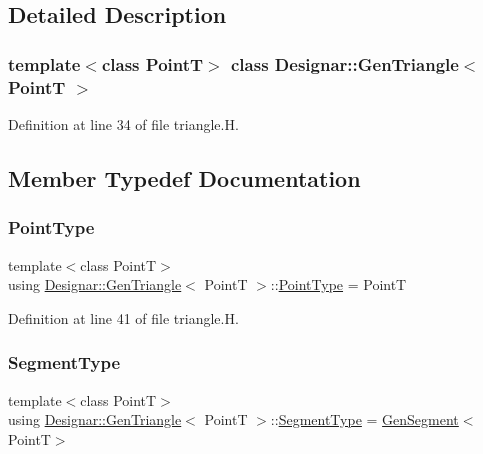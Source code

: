 \subsection{Detailed Description}
\subsubsection*{template$<$class PointT$>$\newline
class Designar\+::\+Gen\+Triangle$<$ Point\+T $>$}



Definition at line 34 of file triangle.\+H.



\subsection{Member Typedef Documentation}
\mbox{\label{class_designar_1_1_gen_triangle_ac6e39b72d793f44a6e12b4f0ede6d472}} 
\subsubsection{\texorpdfstring{Point\+Type}{PointType}}
{\footnotesize\ttfamily template$<$class PointT$>$ \\
using \hyperlink{class_designar_1_1_gen_triangle}{Designar\+::\+Gen\+Triangle}$<$ PointT $>$\+::\hyperlink{class_designar_1_1_gen_triangle_ac6e39b72d793f44a6e12b4f0ede6d472}{Point\+Type} =  PointT}



Definition at line 41 of file triangle.\+H.

\mbox{\label{class_designar_1_1_gen_triangle_a97d5ba127bcf8f120b1d408215956cee}} 
\subsubsection{\texorpdfstring{Segment\+Type}{SegmentType}}
{\footnotesize\ttfamily template$<$class PointT$>$ \\
using \hyperlink{class_designar_1_1_gen_triangle}{Designar\+::\+Gen\+Triangle}$<$ PointT $>$\+::\hyperlink{class_designar_1_1_gen_triangle_a97d5ba127bcf8f120b1d408215956cee}{Segment\+Type} =  \hyperlink{class_designar_1_1_gen_segment}{Gen\+Segment}$<$PointT$>$}



